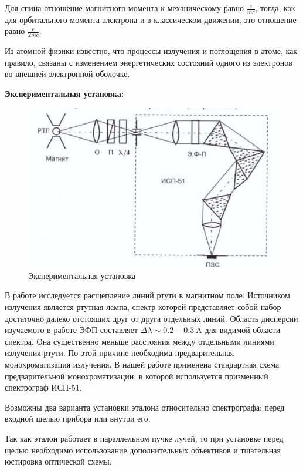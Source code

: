 \documentclass[a4paper, 12pt]{article}%
\begin{document}
	Для спина отношение магнитного момента к механическому равно $\frac{e}{m c}$, тогда, как для орбитального момента электрона и в классическом движении, это отношение равно $\frac{e}{2 m c}$.

	Из атомной физики известно, что процессы излучения и поглощения в атоме, как правило, связаны с изменением энергетических состояний одного из электронов во внешней электронной оболочке.
	
	 

	
	\textbf{Экспериментальная установка: }\\
	
	\begin{figure}[h!]
		\centering
		\includegraphics[width=1\linewidth]{ust}
		\caption{Экспериментальная установка}
	\end{figure}
	В работе исследуется расщепление линий ртути в магнитном поле. Источником излучения является ртутная лампа, спектр которой представляет собой набор достаточно далеко отстоящих друг от друга отдельных линий.
	Область дисперсии изучаемого в работе ЭФП составляет
	$\Delta \lambda \sim 0.2-0.3 \mathrm{~A}$ для видимой области спектра. Она существенно меньше расстояния между отдельными линиями излучения ртути. По этой причине необходима предварительная монохроматизация излучения. В нашей работе применена стандартная схема предварительной монохроматизации, в которой используется призменный спектрограф ИСП-51.
	
	Возможны два варианта установки эталона относительно спектрографа: перед входной щелью прибора или внутри его.
	
	Так как эталон работает в параллельном пучке лучей, то при установке перед щелью необходимо использование дополнительных объективов и тщательная юстировка оптической схемы.
	
\end{document}
